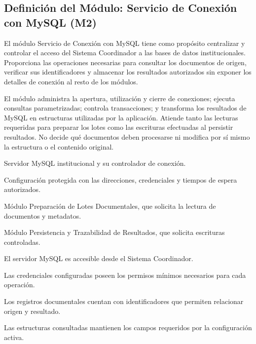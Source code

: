 
\subsection{Definición del Módulo: Servicio de Conexión con MySQL (M2)}
\label{subsec:modulo_m2}

\begin{definicionmodulo}

\item[Propósito] El módulo Servicio de Conexión con MySQL tiene como propósito centralizar y controlar el acceso del Sistema Coordinador a las bases de datos institucionales. Proporciona las operaciones necesarias para consultar los documentos de origen, verificar sus identificadores y almacenar los resultados autorizados sin exponer los detalles de conexión al resto de los módulos.

\item[Alcance] El módulo administra la apertura, utilización y cierre de conexiones; ejecuta consultas parametrizadas; controla transacciones; y transforma los resultados de MySQL en estructuras utilizadas por la aplicación. Atiende tanto las lecturas requeridas para preparar los lotes como las escrituras efectuadas al persistir resultados. No decide qué documentos deben procesarse ni modifica por sí mismo la estructura o el contenido original.

\item[Dependencias]
\begin{elementosmodulo}
    \item Servidor MySQL institucional y su controlador de conexión.
    \item Configuración protegida con las direcciones, credenciales y tiempos de espera autorizados.
    \item Módulo Preparación de Lotes Documentales, que solicita la lectura de documentos y metadatos.
    \item Módulo Persistencia y Trazabilidad de Resultados, que solicita escrituras controladas.
\end{elementosmodulo}

\item[Supuestos]
\begin{elementosmodulo}
    \item El servidor MySQL es accesible desde el Sistema Coordinador.
    \item Las credenciales configuradas poseen los permisos mínimos necesarios para cada operación.
    \item Los registros documentales cuentan con identificadores que permiten relacionar origen y resultado.
    \item Las estructuras consultadas mantienen los campos requeridos por la configuración activa.
\end{elementosmodulo}


\end{definicionmodulo}
